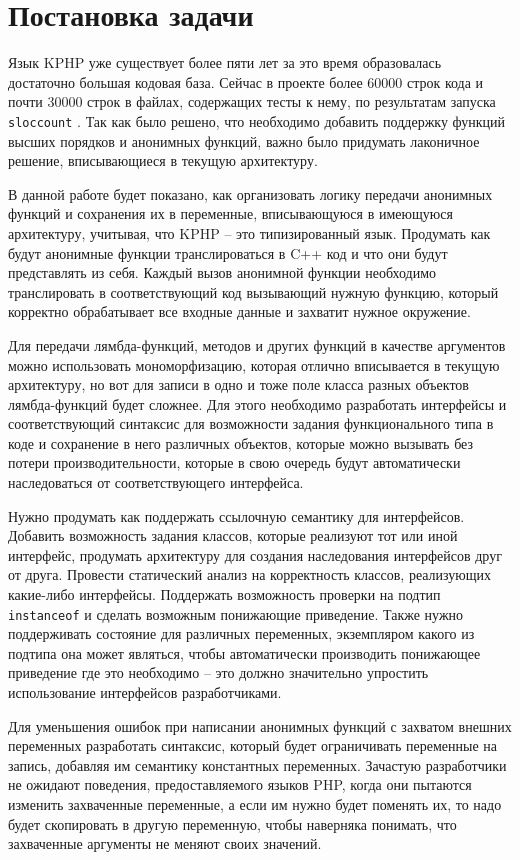 
\chapter{Постановка задачи}
Язык KPHP уже существует более пяти лет за это время образовалась достаточно большая кодовая база.
Сейчас в проекте более 60000 строк кода и почти 30000 строк в файлах, содержащих тесты к нему, по результатам запуска \verb|sloccount| \cite{sloccount}. Так как было решено, что необходимо добавить поддержку функций высших порядков и анонимных функций, важно было придумать лаконичное решение, вписывающиеся в текущую архитектуру.

В данной работе будет показано, как организовать логику передачи анонимных функций и сохранения их в переменные, вписывающуюся в имеющуюся архитектуру, учитывая, что KPHP -- это типизированный язык. Продумать как будут анонимные функции транслироваться в C++ код и что они будут представлять из себя. Каждый вызов анонимной функции необходимо транслировать в соответствующий код вызывающий нужную функцию, который корректно обрабатывает все входные данные и захватит нужное окружение.

Для передачи лямбда-функций, методов и других функций в качестве аргументов можно использовать мономорфизацию, которая отлично вписывается в текущую архитектуру, но вот для записи в одно и тоже поле класса разных объектов лямбда-функций будет сложнее. Для этого необходимо разработать интерфейсы и соответствующий синтаксис для возможности задания функционального типа в коде и сохранение в него различных объектов, которые можно вызывать без потери производительности, которые в свою очередь будут автоматически наследоваться от соответствующего интерфейса. 

Нужно продумать как поддержать ссылочную семантику для интерфейсов.
Добавить возможность задания классов, которые реализуют тот или иной интерфейс, продумать архитектуру для создания наследования интерфейсов друг от друга.
Провести статический анализ на корректность классов, реализующих какие-либо интерфейсы.
Поддержать возможность проверки на подтип \verb|instanceof| и сделать возможным понижающие приведение.
Также нужно поддерживать состояние для различных переменных, экземпляром какого из подтипа она может являться, чтобы автоматически производить понижающее приведение где это необходимо -- это должно значительно упростить использование интерфейсов разработчиками.

Для уменьшения ошибок при написании анонимных функций с захватом внешних переменных разработать синтаксис, который будет ограничивать переменные на запись, добавляя им семантику константных переменных.
Зачастую разработчики не ожидают поведения, предоставляемого языков PHP, когда они пытаются изменить захваченные переменные, а если им нужно будет поменять их, то надо будет скопировать в другую переменную, чтобы наверняка понимать, что захваченные аргументы не меняют своих значений.

